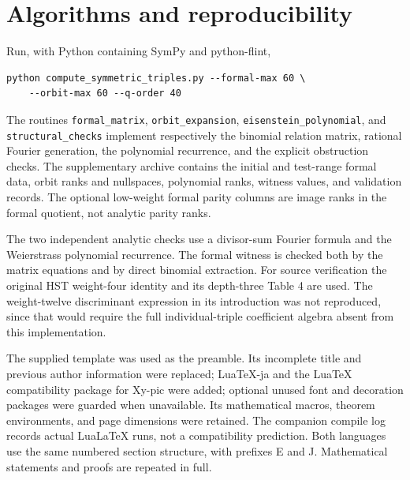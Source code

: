 \documentclass[12pt]{amsart}
\theoremstyle{definition}
\theoremstyle{remark}
\numberwithin{equation}{section}
\numberwithin{equation}{section}
\begin{document}
\section{Algorithms and reproducibility}
Run, with Python containing SymPy and python-flint,
\begin{verbatim}
python compute_symmetric_triples.py --formal-max 60 \
    --orbit-max 60 --q-order 40
\end{verbatim}
The routines \texttt{formal\_matrix}, \texttt{orbit\_expansion},
\texttt{eisenstein\_polynomial}, and \texttt{structural\_checks} implement
respectively the binomial relation matrix, rational Fourier generation,
the polynomial recurrence, and the explicit obstruction checks.
The supplementary archive contains the initial and test-range formal data,
orbit ranks and nullspaces, polynomial ranks, witness values, and validation
records. The optional low-weight formal parity columns are image ranks in
the formal quotient, not analytic parity ranks.

The two independent analytic checks use a divisor-sum Fourier formula and
the Weierstrass polynomial recurrence. The formal witness is checked both
by the matrix equations and by direct binomial extraction. For source
verification the original HST weight-four identity and its depth-three
Table 4 are used. The weight-twelve discriminant expression in its
introduction was not reproduced, since that would require the full
individual-triple coefficient algebra absent from this implementation.

The supplied template was used as the preamble. Its incomplete title and
previous author information were replaced; LuaTeX-ja and the LuaTeX
compatibility package for Xy-pic were added; optional unused font and
decoration packages were guarded when unavailable. Its mathematical
macros, theorem environments, and page dimensions were retained.
The companion compile log records actual LuaLaTeX runs, not a compatibility
prediction. Both languages use the same numbered section structure, with
prefixes E and J. Mathematical statements and proofs are repeated in full.
\end{document}

